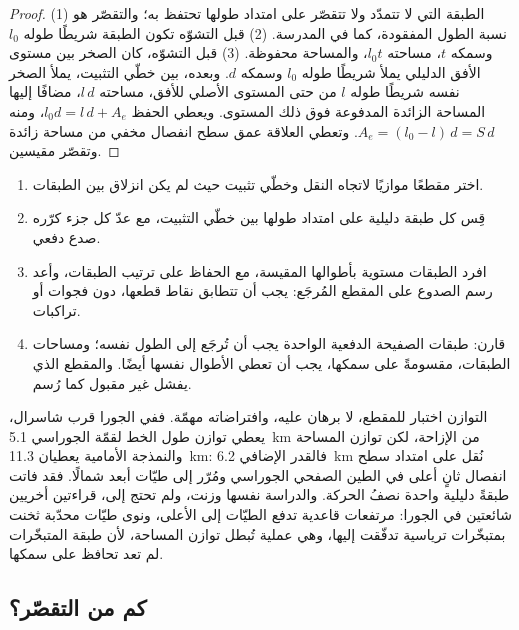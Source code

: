 \begin{proof}
(1) الطبقة التي لا تتمدّد ولا تتقصّر على امتداد طولها تحتفظ به؛ والتقصّر هو
نسبة الطول المفقودة، كما في المدرسة. (2) قبل التشوّه تكون الطبقة شريطًا
طوله $l_0$ وسمكه $t$، مساحته $l_0 t$، والمساحة محفوظة. (3) قبل
التشوّه، كان الصخر بين مستوى الأفق الدليلي  يملأ شريطًا طوله $l_0$
وسمكه $d$. وبعده، بين خطّي التثبيت، يملأ الصخر نفسه شريطًا طوله $l$
من  حتى المستوى الأصلي للأفق، مساحته $l\,d$، مضافًا إليها المساحة الزائدة
المدفوعة فوق ذلك المستوى. ويعطي الحفظ $l_0 d = l\,d + A_e$، ومنه $A_e = (l_0 -
l)\,d = S\,d$. وتعطي العلاقة عمق سطح انفصال مخفي من مساحة زائدة
وتقصّر مقيسين.
\end{proof}


\begin{method}\label{met:b2:alpine-orogen:restore}
\begin{enumerate}
\item اختر مقطعًا موازيًا لاتجاه النقل وخطّي تثبيت حيث لم يكن
انزلاق بين الطبقات.
\item قِس كل طبقة دليلية على امتداد طولها بين خطّي التثبيت، مع عدّ كل جزء
كرّره صدع دفعي.
\item افرد الطبقات مستوية بأطوالها المقيسة، مع الحفاظ على ترتيب الطبقات،
وأعد رسم الصدوع على المقطع المُرجَع: يجب أن تتطابق نقاط قطعها، دون فجوات
أو تراكبات.
\item قارن: طبقات الصفيحة الدفعية الواحدة يجب أن تُرجَع إلى الطول نفسه؛ ومساحات
الطبقات، مقسومةً على سمكها، يجب أن تعطي الأطوال نفسها أيضًا. والمقطع الذي
يفشل غير مقبول كما رُسم.
\end{enumerate}
\end{method}

التوازن اختبار للمقطع، لا برهان عليه، وافتراضاته مهمّة. ففي الجورا
قرب شاسرال، يعطي توازن طول الخط لقمّة الجوراسي \qty{5.1}{km} من
الإزاحة، لكن توازن المساحة والنمذجة الأمامية يعطيان \qty{11.3}{km}: فالقدر الإضافي
\qty{6.2}{km} نُقل على امتداد سطح انفصال ثانٍ أعلى في الطين الصفحي الجوراسي ومُرّر
إلى طيّات أبعد شمالًا. فقد فاتت طبقةً دليلية واحدة نصفُ الحركة. والدراسة نفسها
وزنت، ولم تحتج إلى، قراءتين أخريين شائعتين في الجورا: مرتفعات قاعدية تدفع
الطيّات إلى الأعلى، ونوى طيّات محدّبة ثخنت بمتبخّرات ترياسية تدفّقت إليها، وهي
عملية تُبطل توازن المساحة، لأن طبقة المتبخّرات لم تعد تحافظ على
سمكها.

\subsection*{كم من التقصّر؟}

